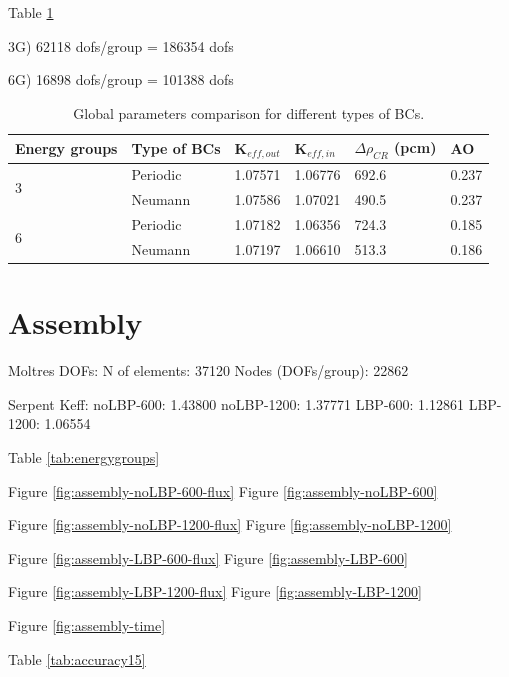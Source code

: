 \documentclass[11pt,letterpaper]{article}
\begin{document}
Table \ref{tab:benchmark-bc}

3G)
62118 dofs/group = 186354 dofs

6G)
16898 dofs/group = 101388 dofs

\begin{table}[htbp!]
  \centering
  \caption{Global parameters comparison for different types of BCs.}
  \begin{tabular}{l|l|l|l|l|l}
  \toprule
  Energy groups       & Type of BCs & K$_{eff, out}$ & K$_{eff, in}$ & $\Delta \rho_{CR}$ (pcm) & AO \\
  \midrule
  \multirow{2}{*}{3}  & Periodic    & 1.07571		& 1.06776		& 692.6		& 0.237		\\
                      & Neumann     & 1.07586	  & 1.07021   & 490.5		& 0.237	  \\ \hline
  \multirow{2}{*}{6}  & Periodic    & 1.07182		& 1.06356		& 724.3	  & 0.185  	\\
                      & Neumann     & 1.07197   & 1.06610 	& 513.3		& 0.186		\\  
  \bottomrule
  \end{tabular}
  \label{tab:benchmark-bc}
\end{table}



\section{Assembly}

Moltres DOFs: 
N of elements: 37120
Nodes (DOFs/group): 22862

Serpent Keff:
noLBP-600: 1.43800
noLBP-1200: 1.37771
LBP-600: 1.12861
LBP-1200: 1.06554

Table \ref{tab:energygroups}

Figure \ref{fig:assembly-noLBP-600-flux}
Figure \ref{fig:assembly-noLBP-600}

Figure \ref{fig:assembly-noLBP-1200-flux}
Figure \ref{fig:assembly-noLBP-1200}

Figure \ref{fig:assembly-LBP-600-flux}
Figure \ref{fig:assembly-LBP-600}

Figure \ref{fig:assembly-LBP-1200-flux}
Figure \ref{fig:assembly-LBP-1200}

Figure \ref{fig:assembly-time}

Table \ref{tab:accuracy15}
\end{document}
